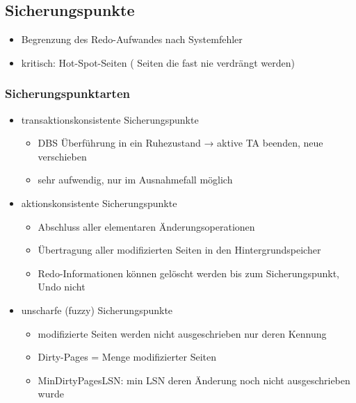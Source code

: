 \documentclass[a4paper]{article}
\begin{document}
\subsection{Sicherungspunkte}
\begin{itemize}
    \item Begrenzung des Redo-Aufwandes nach Systemfehler
    \item kritisch: Hot-Spot-Seiten ( Seiten die fast nie verdrängt werden)
\end{itemize}

    \subsubsection{Sicherungspunktarten}
    \begin{itemize}
        \item transaktionskonsistente Sicherungspunkte
        
        \begin{itemize}
            \item DBS Überführung in ein Ruhezustand → aktive TA beenden, neue verschieben
            \item sehr aufwendig, nur im Ausnahmefall möglich
        \end{itemize}
        
        \item aktionskonsistente Sicherungspunkte
        
        \begin{itemize}
            \item Abschluss aller elementaren Änderungsoperationen
            \item Übertragung aller modifizierten Seiten in den Hintergrundspeicher
            \item Redo-Informationen können gelöscht werden bis zum Sicherungspunkt, Undo nicht
        \end{itemize}
        
        \item unscharfe (fuzzy) Sicherungspunkte
        
        \begin{itemize}
            \item modifizierte Seiten werden nicht ausgeschrieben nur deren Kennung
            \item Dirty-Pages = Menge modifizierter Seiten
            \item MinDirtyPagesLSN: min LSN deren Änderung noch nicht ausgeschrieben wurde
        \end{itemize}
    \end{itemize}
\end{document}
